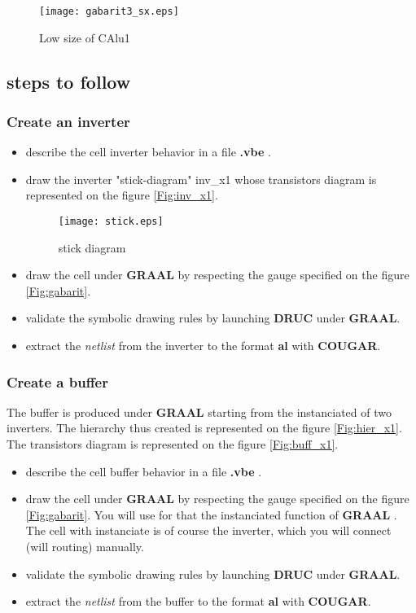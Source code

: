 \documentclass[12pt]{article}
\begin{document}
\begin{figure}[H]\centering
  \texttt{[image: gabarit3\_sx.eps]}
  \caption{Low size of CAlu1}
  \label{Fig:gabarit3}
\end{figure}

\subsection{steps to follow}

\subsubsection{Create an inverter}

\begin{itemize}\itemsep=-.4ex
\item   describe the cell inverter behavior in a file { \bf .vbe } .
\item   draw the inverter "stick-diagram" inv\_x1 whose transistors diagram
        is represented on the figure \ref{Fig:inv_x1}.

\begin{figure}[H]\centering
  \texttt{[image: stick.eps]}
  \caption{stick diagram}
  \label{Fig:stick}
\end{figure}

\item   draw the cell under {\bf GRAAL} by respecting the
        gauge specified on the figure \ref{Fig:gabarit}.
\item   validate the symbolic drawing rules by launching {\bf DRUC} under {\bf GRAAL}.
\item   extract the { \it netlist } \/from the inverter to the format {\bf al} with {\bf COUGAR}.
\end{itemize}

\subsubsection{Create a buffer}

The buffer is produced under { \bf GRAAL } starting from the
instanciated of two inverters. The hierarchy thus created is
represented on the figure \ref{Fig:hier_x1}. The transistors
diagram is represented on the figure \ref{Fig:buff_x1}.

\begin{itemize}\itemsep=-.4ex
\item   describe the cell buffer behavior in a file { \bf .vbe }.
\item   draw the cell under {\bf GRAAL} by respecting the
        gauge specified on the figure \ref{Fig:gabarit}.
        You will use for that the instanciated function of { \bf GRAAL }.
        The cell with instanciate is of course the inverter, which you will connect (will routing) manually.
\item   validate the symbolic drawing rules by launching {\bf DRUC} under {\bf GRAAL}.
\item   extract the { \it netlist } \/from the buffer to the format {\bf al} with {\bf COUGAR}.
\end{itemize}
\end{document}
